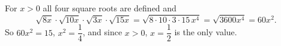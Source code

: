 For $x>0$ all four square roots are defined and
\[
\sqrt{8x}\cdot\sqrt{10x}\cdot\sqrt{3x}\cdot\sqrt{15x}=\sqrt{8\cdot10\cdot3\cdot15\,x^4}=\sqrt{3600x^4}=60x^2 .
\]
So $60x^2=15$, $x^2=\dfrac{1}{4}$, and since $x>0$, $\boxed{x=\dfrac{1}{2}}$ is the only value.
